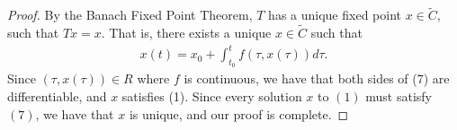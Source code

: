 \documentclass[10pt,a4paper]{article}
\theoremstyle{theorem}
\theoremstyle{definition}
\begin{document}
\begin{proof}
By the Banach Fixed Point Theorem, $T$ has a unique fixed point $x \in \tilde{C}$, such that $Tx = x$. That is, there exists a unique $x \in \tilde{C}$ such that 
\begin{align}
x(t) = x_0 + \int_{t_0}^{t} f(\tau, x(\tau))d \tau.
\end{align}
Since $(\tau, x(\tau)) \in R$ where $f$ is continuous, we have that both sides of (7) are differentiable,  and $x$ satisfies (1).  Since every solution $x$ to $(1)$ must satisfy $(7)$,  we have that $x$ is unique, and our proof is complete.
\end{proof}
\end{document}
